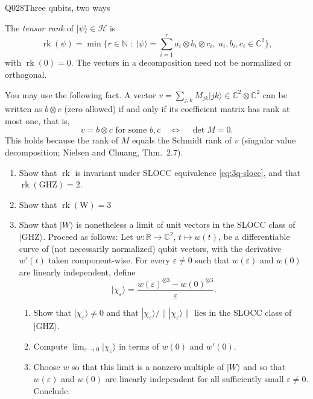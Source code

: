 \begin{entry}{Q028}{Three qubits, two ways}
\begin{problem}
The \emph{tensor rank} of $|\psi\rangle \in \mathcal{H}$ is
\begin{equation}\label{eq:3q-rank}
  \operatorname{rk}(\psi)
  = \min\Big\{ r \in \mathbb{N} \;:\;
    |\psi\rangle = \sum_{i=1}^{r} a_i \otimes b_i \otimes c_i,\;
    a_i, b_i, c_i \in \mathbb{C}^2 \Big\},
\end{equation}
with $\operatorname{rk}(0) = 0$. The vectors in a decomposition need not be
normalized or orthogonal.

You may use the following fact. A vector
$v = \sum_{j,k} M_{jk}|jk\rangle \in \mathbb{C}^2\otimes\mathbb{C}^2$ can be
written as $b\otimes c$ (zero allowed) if and only if its coefficient matrix
has rank at most one, that is,
\begin{equation}
  v = b\otimes c \text{ for some } b, c
  \quad\Longleftrightarrow\quad
  \det M = 0 .
  \label{q028: identity for rank 2}
\end{equation}
This holds because the rank of $M$ equals the Schmidt rank of $v$ (singular
value decomposition; Nielsen and Chuang, Thm.~2.7).

\begin{enumerate}
  \item[(a)] Show that $\operatorname{rk}$ is invariant under SLOCC
  equivalence \eqref{eq:3q-slocc}, and that
  $\operatorname{rk}(\mathrm{GHZ}) = 2$.

  \item[(b)] Show that $\operatorname{rk}(\mathrm{W}) = 3$

  \item[(d)] Show that $|W\rangle$ is nonetheless a limit of unit vectors in
  the SLOCC class of $|\mathrm{GHZ}\rangle$. Proceed as follows:
  Let $w : \mathbb{R} \to \mathbb{C}^2$, $t \mapsto w(t)$, be a
  differentiable curve of (not necessarily normalized) qubit vectors, with
  the derivative $w'(t)$ taken component-wise. For every $\varepsilon \neq 0$
  such that $w(\varepsilon)$ and $w(0)$ are linearly independent, define
  \begin{equation}\label{eq:3q-quotient}
    |\chi_\varepsilon\rangle
    = \frac{w(\varepsilon)^{\otimes 3} - w(0)^{\otimes 3}}{\varepsilon}.
  \end{equation}
  \begin{enumerate}
    \item[(i)] Show that $|\chi_\varepsilon\rangle \neq 0$ and that
    $|\chi_\varepsilon\rangle / \||\chi_\varepsilon\rangle\|$ lies in the
    SLOCC class of $|\mathrm{GHZ}\rangle$.
    \item[(ii)] Compute $\lim_{\varepsilon\to 0} |\chi_\varepsilon\rangle$ in
    terms of $w(0)$ and $w'(0)$.
    \item[(iii)] Choose $w$ so that this limit is a nonzero multiple of
    $|W\rangle$ and so that $w(\varepsilon)$ and $w(0)$ are linearly
    independent for all sufficiently small $\varepsilon \neq 0$. Conclude.
  \end{enumerate}


\end{enumerate}
\end{problem}
\end{entry}
